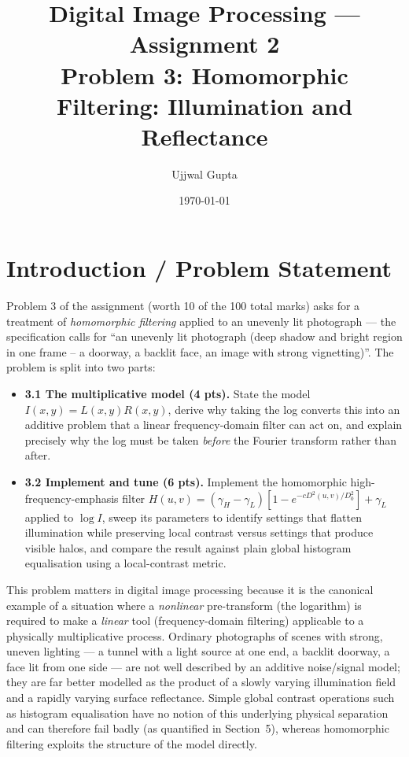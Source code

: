 \documentclass[11pt]{article}
\title{\textbf{Digital Image Processing --- Assignment 2}\\[0.3em]\large Problem 3: Homomorphic Filtering: Illumination and Reflectance}
\author{Ujjwal Gupta}
\date{\today}
\begin{document}
\maketitle
\tableofcontents
\vspace{1em}

\section{Introduction / Problem Statement}

Problem 3 of the assignment (worth 10 of the 100 total marks) asks for a treatment of
\emph{homomorphic filtering} applied to an unevenly lit photograph --- the specification
calls for ``an unevenly lit photograph (deep shadow and bright region in one frame -- a
doorway, a backlit face, an image with strong vignetting)''. The problem is split into
two parts:

\begin{itemize}[leftmargin=1.5em]
  \item \textbf{3.1 The multiplicative model (4 pts).} State the model
  $I(x,y) = L(x,y)R(x,y)$, derive why taking the log converts this into an additive
  problem that a linear frequency-domain filter can act on, and explain precisely why
  the log must be taken \emph{before} the Fourier transform rather than after.
  \item \textbf{3.2 Implement and tune (6 pts).} Implement the homomorphic
  high-frequency-emphasis filter
  $H(u,v) = (\gamma_H-\gamma_L)\left[1-e^{-cD^2(u,v)/D_0^2}\right]+\gamma_L$ applied to
  $\log I$, sweep its parameters to identify settings that flatten illumination while
  preserving local contrast versus settings that produce visible halos, and compare the
  result against plain global histogram equalisation using a local-contrast metric.
\end{itemize}

This problem matters in digital image processing because it is the canonical example of
a situation where a \emph{nonlinear} pre-transform (the logarithm) is required to make a
\emph{linear} tool (frequency-domain filtering) applicable to a physically multiplicative
process. Ordinary photographs of scenes with strong, uneven lighting --- a tunnel with a
light source at one end, a backlit doorway, a face lit from one side --- are not well
described by an additive noise/signal model; they are far better modelled as the product
of a slowly varying illumination field and a rapidly varying surface reflectance. Simple
global contrast operations such as histogram equalisation have no notion of this
underlying physical separation and can therefore fail badly (as quantified in Section~5),
whereas homomorphic filtering exploits the structure of the model directly.
\end{document}
